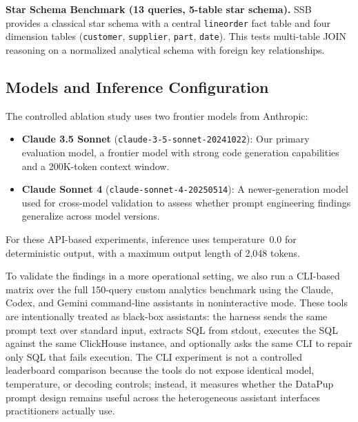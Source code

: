 \documentclass[sigconf, nonacm]{acmart}
\begin{document}
\textbf{Star Schema Benchmark (13 queries, 5-table star schema).} SSB~\cite{oneil2009ssb} provides a classical star schema with a central \texttt{lineorder} fact table and four dimension tables (\texttt{customer}, \texttt{supplier}, \texttt{part}, \texttt{date}). This tests multi-table JOIN reasoning on a normalized analytical schema with foreign key relationships.

\subsection{Models and Inference Configuration}
The controlled ablation study uses two frontier models from Anthropic:
\begin{itemize}
    \item \textbf{Claude 3.5 Sonnet} (\texttt{claude-3-5-sonnet-20241022}): Our primary evaluation model, a frontier model with strong code generation capabilities and a 200K-token context window.
    \item \textbf{Claude Sonnet 4} (\texttt{claude-sonnet-4-20250514}): A newer-generation model used for cross-model validation to assess whether prompt engineering findings generalize across model versions.
\end{itemize}
For these API-based experiments, inference uses temperature~0.0 for deterministic output, with a maximum output length of 2,048 tokens.

To validate the findings in a more operational setting, we also run a CLI-based matrix over the full 150-query custom analytics benchmark using the Claude, Codex, and Gemini command-line assistants in noninteractive mode. These tools are intentionally treated as black-box assistants: the harness sends the same prompt text over standard input, extracts SQL from stdout, executes the SQL against the same ClickHouse instance, and optionally asks the same CLI to repair only SQL that fails execution. The CLI experiment is not a controlled leaderboard comparison because the tools do not expose identical model, temperature, or decoding controls; instead, it measures whether the DataPup prompt design remains useful across the heterogeneous assistant interfaces practitioners actually use.
\end{document}

